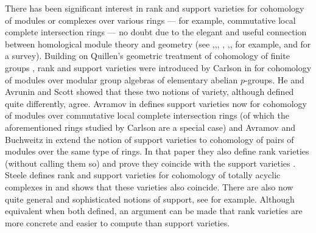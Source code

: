 \documentclass{amsart}[11pt]
\numberwithin{equation}{section}
\theoremstyle{plain}
\newtheorem*{Main Theorem}{Main Theorem}
\theoremstyle{definition}
\theoremstyle{remark}
\numberwithin{equation}{theorem}
\begin{document}
There has been significant interest in rank and support varieties for cohomology of modules or complexes over various rings --- for example, commutative local complete intersection rings --- no doubt due to the elegant and useful connection between homological module theory and geometry (see \cite{BenIKP},\cite{BerPW1},\cite{BerPW2}, \cite{FP}, \cite{NP},\cite{PW}, for example, and \cite{C2} for a survey).  Building on Quillen's geometric treatment of cohomology of finite groups \cite{Q}, rank and support varieties were introduced by Carlson in \cite{C1} for cohomology of modules over modular group algebras of elementary abelian $p$-groups. He and Avrunin and Scott \cite{AvS} showed that these two notions of variety, although defined quite differently, agree.  Avramov in \cite{A1} defines support varieties now for cohomology of modules over commutative local complete intersection rings (of which the aforementioned rings studied by Carlson are a special case) and Avramov and Buchweitz in \cite{AB} extend the notion of support varieties to cohomology of pairs of modules over the same type of rings.  In that paper they also define rank varieties (without calling them so) and prove they coincide with the support varieties \cite[Theorem 2.5]{AB}. Steele defines rank and support varieties for cohomology of totally acyclic complexes in \cite{S} and shows that these varieties also coincide.
There are also now quite general and sophisticated notions of support, see \cite{BenIK} for example. 
Although equivalent when both defined, an argument can be made that rank varieties are more concrete and easier to compute than support varieties. 
\end{document}
